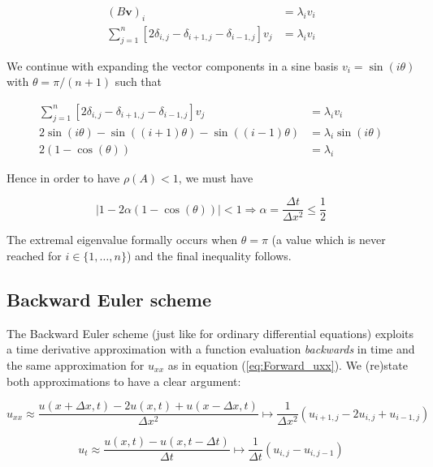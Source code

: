 \documentclass[a4paper, 11pt, notitlepage,english]{article}
\begin{document}
\begin{align}
(B\boldsymbol{v})_i &= \lambda_i v_i \\
\sum_{j=1}^n [2\delta_{i,j}-\delta_{i+1,j}-\delta_{i-1,j}]v_j &= \lambda_i v_i
\label{eq:Forward_Euler_stability1}
\end{align}

We continue with expanding the vector components in a sine basis $v_i = \sin(i\theta)$ with $\theta = \pi/(n+1)$ such that

\begin{align}
\sum_{j=1}^n [2\delta_{i,j}-\delta_{i+1,j}-\delta_{i-1,j}]v_j &= \lambda_i v_i \\
2 \sin(i\theta) - \sin\left((i+1)\theta\right) - \sin\left((i-1)\theta\right) &= \lambda_i \sin(i\theta) \\
2(1-\cos(\theta)) &= \lambda_i
\label{eq:Forward_Euler_stability2}
\end{align}

Hence in order to have $\rho(A) < 1$, we must have

\begin{equation}
\lvert 1-2\alpha(1-\cos(\theta)) \rvert < 1 \Rightarrow \alpha = \frac{\Delta t}{\Delta x^2} \leq \frac{1}{2}
\label{eq:Forward_Euler_stability3}
\end{equation}

The extremal eigenvalue formally occurs when $\theta = \pi$ (a value which is never reached for $i \in \{1,\dots, n\}$) and the final inequality follows.

\subsection{Backward Euler scheme}
The Backward Euler scheme (just like for ordinary differential equations) exploits a time derivative approximation with a function evaluation \emph{backwards} in time and the same approximation for $u_{xx}$ as in equation (\ref{eq:Forward_uxx}). We (re)state both approximations to have a clear argument:

\begin{equation}
u_{xx} \approx \frac{u(x+\Delta x,t)-2u(x,t)+u(x-\Delta x, t)}{\Delta x^2} \mapsto \frac{1}{\Delta x^2} (u_{i+1,j}-2u_{i,j}+u_{i-1,j})
\label{eq:Backward_uxx}
\end{equation}

\begin{equation}
u_{t} \approx \frac{u(x,t)-u(x,t-\Delta t)}{\Delta t} \mapsto \frac{1}{\Delta t} (u_{i,j}-u_{i,j-1})
\label{eq:Backward_ut}
\end{equation}
\end{document}
